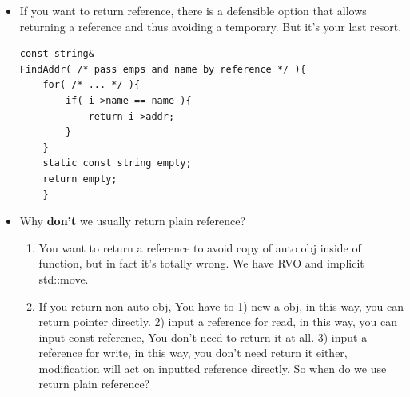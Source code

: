 \documentclass[a4paper,11pt,twoside]{book}
\begin{document}
\begin{itemize}
	\item If you want to return reference,  there is a defensible option that allows returning a reference and thus avoiding a temporary. But it's your last resort.
\begin{lstlisting}[numbers=none]
const string&
FindAddr( /* pass emps and name by reference */ ){
	for( /* ... */ ){
		if( i->name == name ){
			return i->addr;
		}
	}
	static const string empty;
	return empty;
	}
\end{lstlisting}
	
	\item Why \textbf{don't} we usually return plain reference?
	\begin{enumerate}
		\item You want to return a reference to avoid copy of auto obj inside of function, but in fact it's totally wrong. We have RVO and implicit std::move.

		\item If you return non-auto obj, You have to 1) new a obj, in this way, you can return pointer directly. 2) input a reference for read, in this way, you can input const reference, You don't need to return it at all. 3) input a reference for write, in this way, you don't need return it either, modification will act on inputted reference directly. So when do we use return plain reference?
	\end{enumerate}
	
\end{itemize}
\end{document}
